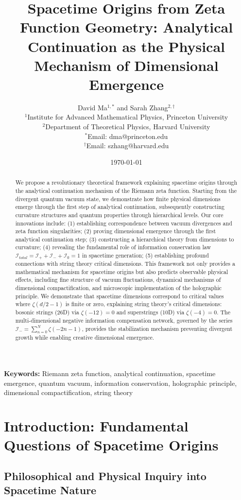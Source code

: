 \documentclass[12pt,a4paper]{article}
\title{\textbf{Spacetime Origins from Zeta Function Geometry: Analytical Continuation as the Physical Mechanism of Dimensional Emergence}}
\author{
David Ma$^{1,*}$ and Sarah Zhang$^{2,\dagger}$ \\[0.5em]
$^1$Institute for Advanced Mathematical Physics, Princeton University \\
$^2$Department of Theoretical Physics, Harvard University \\[0.5em]
$^*$Email: dma@princeton.edu \\
$^{\dagger}$Email: szhang@harvard.edu
}
\date{\today}
\begin{document}
\maketitle

\begin{abstract}
We propose a revolutionary theoretical framework explaining spacetime origins through the analytical continuation mechanism of the Riemann zeta function. Starting from the divergent quantum vacuum state, we demonstrate how finite physical dimensions emerge through the first step of analytical continuation, subsequently constructing curvature structures and quantum properties through hierarchical levels. Our core innovations include: (1) establishing correspondence between vacuum divergences and zeta function singularities; (2) proving dimensional emergence through the first analytical continuation step; (3) constructing a hierarchical theory from dimensions to curvature; (4) revealing the fundamental role of information conservation law $\mathcal{I}_{total} = \mathcal{I}_+ + \mathcal{I}_- + \mathcal{I}_0 = 1$ in spacetime generation; (5) establishing profound connections with string theory critical dimensions. This framework not only provides a mathematical mechanism for spacetime origins but also predicts observable physical effects, including fine structure of vacuum fluctuations, dynamical mechanisms of dimensional compactification, and microscopic implementation of the holographic principle. We demonstrate that spacetime dimensions correspond to critical values where $\zeta(d/2-1)$ is finite or zero, explaining string theory's critical dimensions: bosonic strings (26D) via $\zeta(-12) = 0$ and superstrings (10D) via $\zeta(-4) = 0$. The multi-dimensional negative information compensation network, governed by the series $\mathcal{I}_- = \sum_{n=0}^{N} \zeta(-2n-1)$, provides the stabilization mechanism preventing divergent growth while enabling creative dimensional emergence.
\end{abstract}

\textbf{Keywords:} Riemann zeta function, analytical continuation, spacetime emergence, quantum vacuum, information conservation, holographic principle, dimensional compactification, string theory

\section{Introduction: Fundamental Questions of Spacetime Origins}

\subsection{Philosophical and Physical Inquiry into Spacetime Nature}
\end{document}
